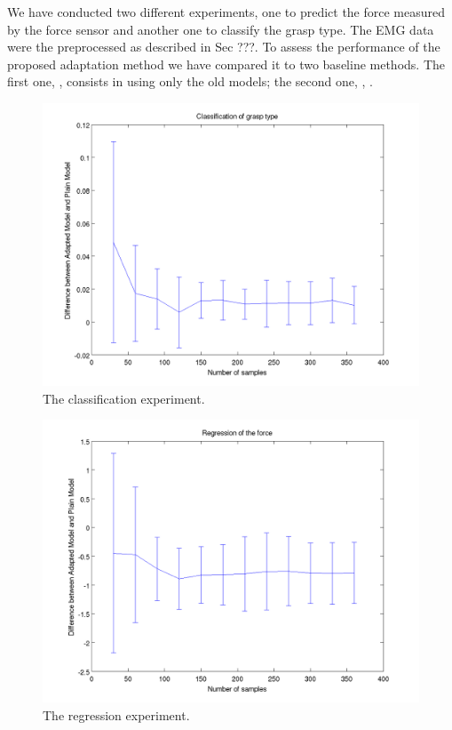 We have conducted two different experiments, one to predict the force measured
by the force sensor and another one to classify the grasp type.
The EMG data were the preprocessed as described in Sec ???.
To assess the performance of the proposed adaptation method we have compared it
to two baseline methods. The first one, \emph{}, consists in using only the old models; the second one, \emph{}, .

\begin{figure}[t]
  \centering
  \includegraphics[width=0.95\linewidth]{figs/exp1}
  \caption{The classification experiment.}
  \label{fig:exp1}
\end{figure}

\begin{figure}[t]
  \centering
  \includegraphics[width=0.95\linewidth]{figs/exp2}
  \caption{The regression experiment.}
  \label{fig:exp2}
\end{figure}